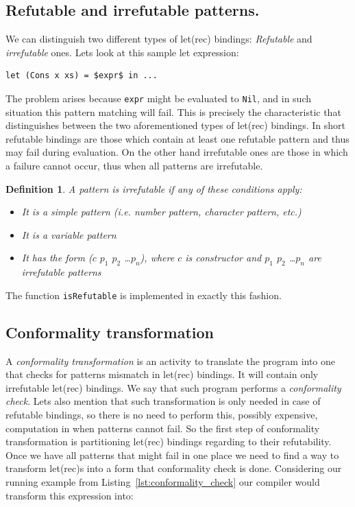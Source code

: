 \documentclass[12pt,a4paper]{report}
\newtheorem{definition}{Definition}[chapter]
\begin{document}
\subsection{Refutable and irrefutable patterns.}
\label{sec:irrefutable_patterns}
We can distinguish two different types of let(rec) bindings: \textit{Refutable}
and \textit{irrefutable} ones. Lets look at this sample let expression:

\vspace*{0.2in}
\begin{lstlisting}[style=haskell,mathescape=true,label=lst:conformality_check,caption={Pattern matching let binding.}]
let (Cons x xs) = $expr$ in ...
\end{lstlisting}
The problem arises because \texttt{expr} might be evaluated to \texttt{Nil},
and in such situation this pattern matching will fail. This is precisely the
characteristic that distinguishes between the two aforementioned types of
let(rec) bindings. In short refutable bindings are those which contain
at least one refutable pattern and thus may fail during evaluation. On the
other hand irrefutable ones are those in which a failure cannot occur, thus
when all patterns are irrefutable.

\begin{definition}
  \label{def:irrefutable_pattern}
  A pattern is irrefutable if any of these conditions apply:
  \begin{itemize}
    \item It is a simple pattern (i.e. number pattern, character pattern, etc.)
    \item It is a variable pattern
    \item It has the form ($c$ $p_{1}$ $p_{2}$ \ldots $p_{n}$), where $c$ is
      constructor and $p_{1}$ $p_{2}$ \ldots $p_{n}$ are irrefutable patterns
  \end{itemize}
\end{definition}
The function \texttt{isRefutable} is implemented in exactly this fashion.

\subsection{Conformality transformation}
\label{sec:conformality_transformation}
A \textit{conformality transformation} is an activity to translate the program
into one that checks for patterns mismatch in let(rec) bindings. It
will contain only irrefutable let(rec) bindings. We say that such
program performs a \textit{conformality check}. Lets also mention that such
transformation is only needed in case of refutable bindings, so there is no need
to perform this, possibly expensive, computation in when patterns cannot fail.
So the first step of conformality transformation is partitioning
let(rec) bindings regarding to their refutability. Once we have all
patterns that might fail in one place we need to find a way to transform
let(rec)s into a form that conformality check is done.  Considering
our running example from Listing~\ref{lst:conformality_check} our compiler
would transform this expression into:
\end{document}
